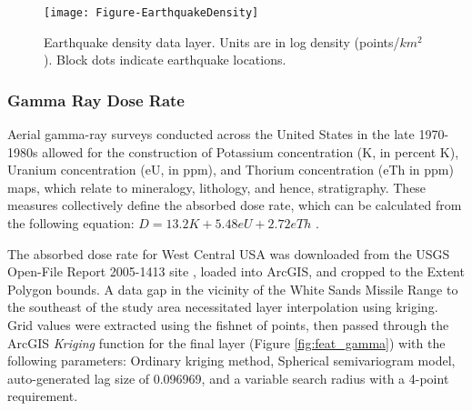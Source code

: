 \begin{figure}[!htp]
\centering
\texttt{[image: Figure-EarthquakeDensity]}
\caption[Earthquake density data layer]{Earthquake density data layer. Units are in log density (points/\(km^2\)). Block dots indicate earthquake locations.}
\label{fig:feat_EQ_density}
\end{figure}

\subsubsection{Gamma Ray Dose Rate}

Aerial gamma-ray surveys conducted across the United States in the late 1970-1980s allowed for the construction of Potassium concentration (K, in percent K), Uranium concentration (eU, in ppm), and Thorium concentration (eTh in ppm) maps, which relate to mineralogy, lithology, and hence, stratigraphy. These measures collectively define the absorbed dose rate, which can be calculated from the following equation: \( D = 13.2 K + 5.48 eU + 2.72 eTh \) \citep{duval_terrestrial_2005}.

The absorbed dose rate for West Central USA was downloaded from the USGS Open-File Report 2005-1413 site \citep{duval_terrestrial_2005}, loaded into ArcGIS, and cropped to the Extent Polygon bounds. A data gap in the vicinity of the White Sands Missile Range to the southeast of the study area necessitated layer interpolation using kriging. Grid values were extracted using the fishnet of points, then passed through the ArcGIS \textit{Kriging} function for the final layer (Figure \ref{fig:feat_gamma}) with the following parameters: Ordinary kriging method, Spherical semivariogram model, auto-generated lag size of 0.096969, and a variable search radius with a 4-point requirement.

